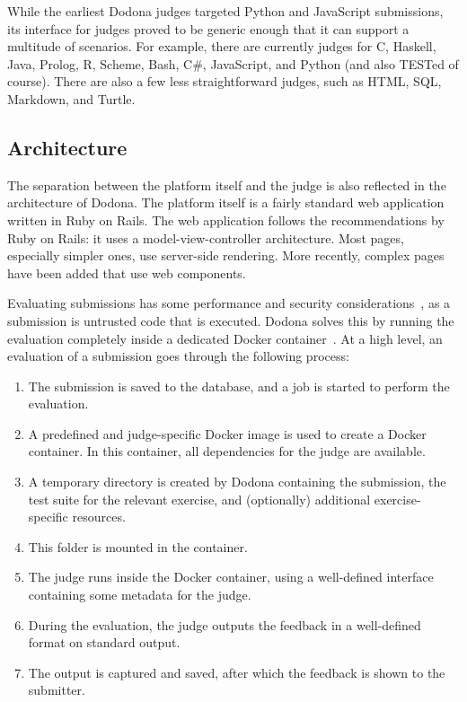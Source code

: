 \documentclass[../main]{subfiles}
\begin{document}
While the earliest Dodona judges targeted Python and JavaScript submissions, its interface for judges proved to be generic enough that it can support a multitude of scenarios.
For example, there are currently judges for C, Haskell, Java, Prolog, R, Scheme, Bash, C\#, JavaScript, and Python (and also TESTed of course).
There are also a few less straightforward judges, such as HTML, SQL, Markdown, and Turtle.

\subsection{Architecture}\label{subsec:architecture}

The separation between the platform itself and the judge is also reflected in the architecture of Dodona.
The platform itself is a fairly standard web application written in Ruby on Rails.
The web application follows the recommendations by Ruby on Rails: it uses a model-view-controller architecture.
Most pages, especially simpler ones, use server-side rendering.
More recently, complex pages have been added that use web components.

Evaluating submissions has some performance and security considerations~\autocite{wasikSurveyOnlineJudge2018}, as a submission is untrusted code that is executed.
Dodona solves this by running the evaluation completely inside a dedicated Docker container~\autocite{pevelerComparingJailedSandboxes2019}.
At a high level, an evaluation of a submission goes through the following process:
\begin{enumerate}[noitemsep]
    \item The submission is saved to the database, and a job is started to perform the evaluation.
    \item A predefined and judge-specific Docker image is used to create a Docker container.
          In this container, all dependencies for the judge are available.
    \item A temporary directory is created by Dodona containing the submission, the test suite for the relevant exercise, and (optionally) additional exercise-specific resources.
    \item This folder is mounted in the container.
    \item The judge runs inside the Docker container, using a well-defined interface containing some metadata for the judge.
    \item During the evaluation, the judge outputs the feedback in a well-defined format on standard output.
    \item The output is captured and saved, after which the feedback is shown to the submitter.
\end{enumerate}
\end{document}
